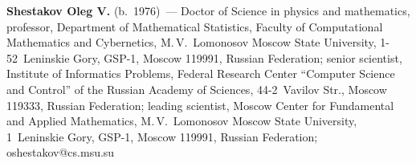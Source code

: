 \vspace*{3pt}

\noindent
\textbf{Shestakov Oleg V.} (b.\ 1976)~--- 
Doctor of Science in physics and mathematics, professor, Department of Mathematical Statistics, 
Faculty of Computational Mathematics and Cybernetics, M.\,V.~Lomonosov Moscow State University, 
1-52~Leninskie Gory, GSP-1, Moscow 119991, Russian Federation; 
senior scientist, Institute of Informatics Problems, Federal Research Center 
``Computer Science and Control'' of the Russian Academy of Sciences, 44-2~Vavilov Str., 
Moscow 119333, Russian Federation; 
leading scientist, Moscow Center for Fundamental and Applied Mathematics, 
M.\,V.~Lomonosov Moscow State University, 1~Leninskie Gory, GSP-1, Moscow 119991, Russian Federation; 
\mbox{oshestakov@cs.msu.su}


\label{end\stat}

\renewcommand{\bibname}{\protect\rm Литература}   